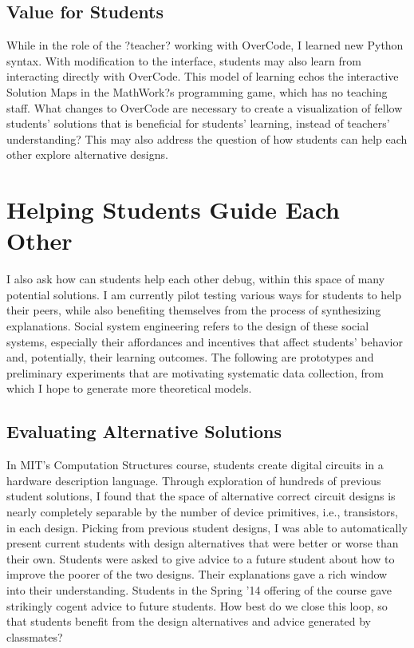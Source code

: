 \documentclass{sigchi}
\begin{document}
\subsection{Value for Students}
While in the role of the ?teacher? working with OverCode, I learned new Python syntax. With modification to the interface, students may also learn from interacting directly with OverCode. This model of learning echos the interactive Solution Maps in the MathWork?s programming game, which has no teaching staff. What changes to OverCode are necessary to create a visualization of fellow students' solutions that is beneficial for students' learning, instead of teachers' understanding? This may also address the question of how students can help each other explore alternative designs.

\section{Helping Students Guide Each Other}
I also ask how can students help each other debug, within this space of many potential solutions. I am currently pilot testing various ways for students to help their peers, while also benefiting themselves from the process of synthesizing explanations. Social system engineering refers to the design of these social systems, especially their affordances and incentives that affect students' behavior and, potentially, their learning outcomes. The following are prototypes and preliminary experiments that are motivating systematic data collection, from which I hope to generate more theoretical models.

\subsection{Evaluating Alternative Solutions} In MIT's Computation Structures course, students create digital circuits in a hardware description language. Through exploration of hundreds of previous student solutions, I found that the space of alternative correct circuit designs is nearly completely separable by the number of device primitives, i.e., transistors, in each design. Picking from previous student designs, I was able to automatically present current students with design alternatives that were better or worse than their own. Students were asked to give advice to a future student about how to improve the poorer of the two designs. Their explanations gave a rich window into their understanding. Students in the Spring '14 offering of the course gave strikingly cogent advice to future students. How best do we close this loop, so that students benefit from the design alternatives and advice generated by classmates? 
\end{document}

